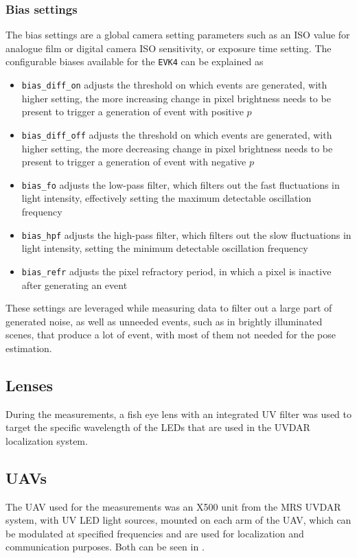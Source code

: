 \subsubsection{Bias settings}
The bias settings are a global camera setting parameters such as an ISO value for analogue film or digital camera ISO sensitivity, or exposure time setting.
The configurable biases available for the \texttt{EVK4} can be explained as\cite{dilmaghani2022controlevaluationeventcameras}
\begin{itemize}
    \item \texttt{bias\_diff\_on} adjusts the threshold on which events are generated, with higher setting, the more increasing change in pixel brightness needs to be present to trigger a generation of event with positive $p$
    \item \texttt{bias\_diff\_off} adjusts the threshold on which events are generated, with higher setting, the more decreasing change in pixel brightness needs to be present to trigger a generation of event with negative $p$
    \item \texttt{bias\_fo} adjusts the low-pass filter, which filters out the fast fluctuations in light intensity, effectively setting the maximum detectable oscillation frequency
    \item \texttt{bias\_hpf} adjusts the high-pass filter, which filters out the slow fluctuations in light intensity, setting the minimum detectable oscillation frequency
    \item \texttt{bias\_refr} adjusts the pixel refractory period, in which a pixel is inactive after generating an event
\end{itemize}
These settings are leveraged while measuring data to filter out a large part of generated noise, as well as unneeded events, such as in brightly illuminated scenes, that produce a lot of event, with most of them not needed for the pose estimation.

\subsection{Lenses}
During the measurements, a fish eye lens with an integrated \ac{UV} filter was used to target the specific wavelength of the \ac{LED}s
that are used in the UVDAR localization system.

\subsection{UAVs}
The \ac{UAV} used for the measurements was an X500 unit from the \ac{MRS} UVDAR system, with \ac{UV} \ac{LED} light sources,
mounted on each arm of the \ac{UAV}, which can be modulated at specified frequencies and are used for localization and communication purposes.
Both can be seen in .

